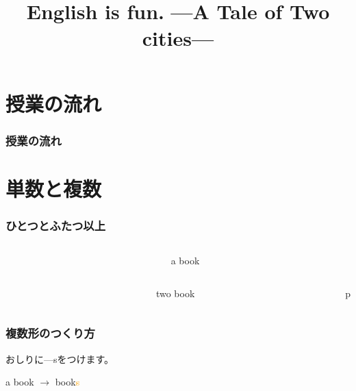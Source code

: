 \documentclass[aspectratio=169]{beamer}
\title{English is fun.\,\,{}---A Tale of Two cities---}
\author{}
\institute[]{}
\date[]
\begin{document}
\begin{frame}[plain]
  \titlepage
\end{frame}

\section*{授業の流れ}
\begin{frame}[plain]
  \frametitle{授業の流れ}
  \tableofcontents
\end{frame}

\section{単数と複数}

\begin{frame}[plain]\frametitle{ひとつとふたつ以上}
\begin{columns}
\begin{column}{.25\textwidth}
\end{column}\pause
\begin{column}{.5\textwidth}\LARGE
a book
\end{column}
\end{columns}

\pause
\begin{columns}
\begin{column}{.25\textwidth}
\end{column}\pause
\begin{column}{.5\textwidth}\LARGE
two book
\end{column}
p
\end{columns}
\end{frame}

\begin{frame}[plain]\frametitle{複数形のつくり方}
 
\Large
おしりに---sをつけます。

a book $\longrightarrow$ book\textcolor{orange}{s}

\end{frame}
\end{document}
